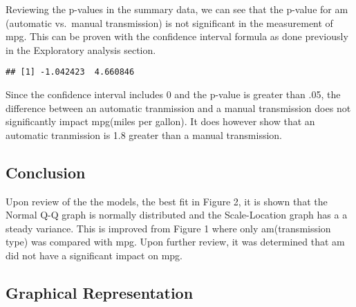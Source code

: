 \documentclass[]{article}
\newenvironment{Shaded}{\begin{snugshade}}{\end{snugshade}}
\newcommand{\KeywordTok}[1]{\textcolor[rgb]{0.13,0.29,0.53}{\textbf{#1}}}
\newcommand{\DataTypeTok}[1]{\textcolor[rgb]{0.13,0.29,0.53}{#1}}
\newcommand{\DecValTok}[1]{\textcolor[rgb]{0.00,0.00,0.81}{#1}}
\newcommand{\FloatTok}[1]{\textcolor[rgb]{0.00,0.00,0.81}{#1}}
\newcommand{\StringTok}[1]{\textcolor[rgb]{0.31,0.60,0.02}{#1}}
\newcommand{\CommentTok}[1]{\textcolor[rgb]{0.56,0.35,0.01}{\textit{#1}}}
\newcommand{\OperatorTok}[1]{\textcolor[rgb]{0.81,0.36,0.00}{\textbf{#1}}}
\newcommand{\NormalTok}[1]{#1}
\begin{document}
Reviewing the p-values in the summary data, we can see that the p-value
for am (automatic vs.~manual transmission) is not significant in the
measurement of mpg. This can be proven with the confidence interval
formula as done previously in the Exploratory analysis section.

\begin{Shaded}
\end{Shaded}

\begin{verbatim}
## [1] -1.042423  4.660846
\end{verbatim}

Since the confidence interval includes 0 and the p-value is greater than
.05, the difference between an automatic tranmission and a manual
transmission does not significantly impact mpg(miles per gallon). It
does however show that an automatic tranmission is 1.8 greater than a
manual transmission.

\subsection{Conclusion}\label{conclusion}

Upon review of the the models, the best fit in Figure 2, it is shown
that the Normal Q-Q graph is normally distributed and the Scale-Location
graph has a a steady variance. This is improved from Figure 1 where only
am(transmission type) was compared with mpg. Upon further review, it was
determined that am did not have a significant impact on mpg.

\subsection{Graphical Representation}\label{graphical-representation}
\end{document}
